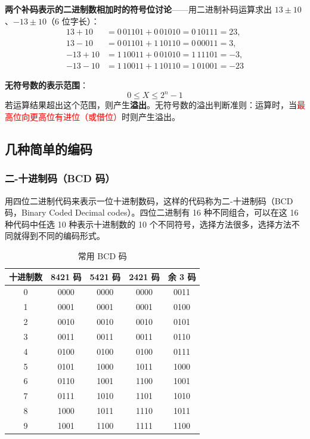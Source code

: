 \textbf{两个补码表示的二进制数相加时的符号位讨论}——用二进制补码运算求出 $13\pm10$、$-13\pm10$（6 位字长）：
	\begin{equation}
		\begin{aligned}
			13+10 &= 0\,01101+0\,01010=0\,10111=23,\\
			13-10 &= 0\,01101+1\,10110=0\,00011=3,\\
			-13+10 &= 1\,10011+0\,01010=1\,11101=-3,\\
			-13-10 &= 1\,10011+1\,10110=1\,01001=-23
		\end{aligned}
		\label{eq:补码:符号位讨论例}
	\end{equation}

\textbf{无符号数的表示范围}：
\begin{equation}
	0\le X\le 2^{n}-1
	\label{eq:补码:无符号范围}
\end{equation}
若运算结果超出这个范围，则产生\textbf{溢出}。无符号数的溢出判断准则：运算时，当\textcolor{red}{最高位向更高位有进位（或借位）}时则产生溢出。

\subsection{几种简单的编码}
\label{sec:几种简单的编码}

\subsubsection{二-十进制码（BCD 码）}

用四位二进制代码来表示一位十进制数码，这样的代码称为二-十进制码（BCD 码，Binary Coded Decimal codes）。四位二进制有 16 种不同组合，可以在这 16 种代码中任选 10 种表示十进制数的 10 个不同符号，选择方法很多，选择方法不同就得到不同的编码形式。

\begin{table}[H]
\centering
\caption{常用 BCD 码}
\label{tab:编码:常用BCD码}
\begin{tabular}{ccccc}
	\toprule
	十进制数 & 8421 码 & 5421 码 & 2421 码 & 余 3 码 \\
	\midrule
	0 & 0000 & 0000 & 0000 & 0011 \\
	1 & 0001 & 0001 & 0001 & 0100 \\
	2 & 0010 & 0010 & 0010 & 0101 \\
	3 & 0011 & 0011 & 0011 & 0110 \\
	4 & 0100 & 0100 & 0100 & 0111 \\
	5 & 0101 & 1000 & 1011 & 1000 \\
	6 & 0110 & 1001 & 1100 & 1001 \\
	7 & 0111 & 1010 & 1101 & 1010 \\
	8 & 1000 & 1011 & 1110 & 1011 \\
	9 & 1001 & 1100 & 1111 & 1100 \\
	\bottomrule
\end{tabular}
\end{table}

